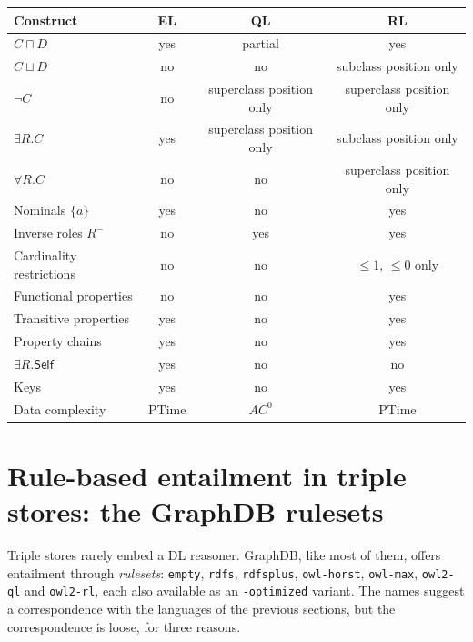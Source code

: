 \documentclass[11pt,a4paper]{article}
\newcommand{\inv}[1]{#1^{-}}
\begin{document}
\begin{table}[h]
\centering
\footnotesize
\begin{tabular}{@{}lccc@{}}
\toprule
\textbf{Construct} & \textbf{EL} & \textbf{QL} & \textbf{RL}\\
\midrule
$C \sqcap D$                       & yes & partial & yes\\
$C \sqcup D$                       & no  & no      & subclass position only\\
$\neg C$                           & no  & superclass position only & superclass position only\\
$\exists R.C$                      & yes & superclass position only & subclass position only\\
$\forall R.C$                      & no  & no      & superclass position only\\
Nominals $\{a\}$                   & yes & no      & yes\\
Inverse roles $\inv{R}$            & no  & yes     & yes\\
Cardinality restrictions           & no  & no      & ${\leq}1$, ${\leq}0$ only\\
Functional properties              & no  & no      & yes\\
Transitive properties              & yes & no      & yes\\
Property chains                    & yes & no      & yes\\
$\exists R.\mathsf{Self}$          & yes & no      & no\\
Keys                               & yes & no      & yes\\
\midrule
Data complexity                    & PTime & $AC^0$ & PTime\\
\bottomrule
\end{tabular}
\end{table}

\section{Rule-based entailment in triple stores: the GraphDB rulesets}
\label{sec:graphdb}

Triple stores rarely embed a DL reasoner. GraphDB, like most of them, offers
entailment through \emph{rulesets}: \texttt{empty}, \texttt{rdfs},
\texttt{rdfsplus}, \texttt{owl-horst}, \texttt{owl-max}, \texttt{owl2-ql} and
\texttt{owl2-rl}, each also available as an \texttt{-optimized} variant.
The names suggest a correspondence with the languages of the previous
sections, but the correspondence is loose, for three reasons.
\end{document}

